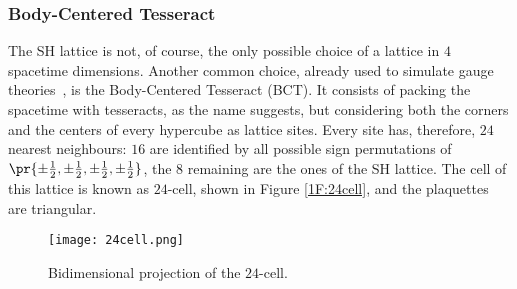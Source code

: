 \subsubsection{Body-Centered Tesseract}
The SH lattice is not, of course, the only possible choice of a lattice in $4$ spacetime dimensions.
Another common choice, already used to simulate gauge theories~\cite{Celmaster:1982ht}, is the Body-Centered Tesseract (BCT).
It consists of packing the spacetime with tesseracts, as the name suggests, but considering both the corners and the centers of every hypercube as lattice sites.
Every site has, therefore, $24$ nearest neighbours: $16$ are identified by all possible sign permutations of $\pr{\pm\frac12,\pm\frac12,\pm\frac12,\pm\frac12}$, the $8$ remaining are the ones of the SH lattice.
The cell of this lattice is known as $24$-cell, shown in Figure \eqref{1F:24cell}, and the plaquettes are triangular.
\begin{figure}[!htbp]
    \centering
    \texttt{[image: 24cell.png]}
    \caption{Bidimensional projection of the $24$-cell.}
    \label{1F:24cell}
\end{figure}


